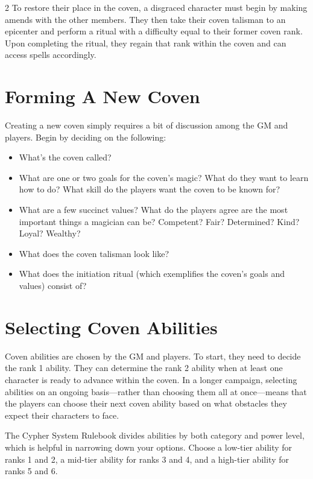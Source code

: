 \begin{multicols}{2}
To restore their place in the coven, a disgraced character must begin by making amends with the other members. They then take their coven talisman to an epicenter and perform a ritual with a difficulty equal to their former coven rank. Upon completing the ritual, they regain that rank within the coven and can access spells accordingly.

\section{Forming A New Coven}

Creating a new coven simply requires a bit of discussion among the GM and players. Begin by deciding on the following: 

\begin{itemize}
\item What’s the coven called? 
\item What are one or two goals for the coven’s magic? What do they want to learn how to do? What skill do the players want the coven to be known for? 
\item What are a few succinct values? What do the players agree are the most important things a magician can be? Competent? Fair? Determined? Kind? Loyal? Wealthy? 
\item What does the coven talisman look like? 
\item What does the initiation ritual (which exemplifies the coven’s goals and values) consist of? 
\end{itemize}

\section{Selecting Coven Abilities}

Coven abilities are chosen by the GM and players. To start, they need to decide the rank 1 ability. They can determine the rank 2 ability when at least one character is ready to advance within the coven. In a longer campaign, selecting abilities on an ongoing basis—rather than choosing them all at once—means that the players can choose their next coven ability based on what obstacles they expect their characters to face. 

The Cypher System Rulebook divides abilities by both category and power level, which is helpful in narrowing down your options. Choose a low-tier ability for ranks 1 and 2, a mid-tier ability for ranks 3 and 4, and a high-tier ability for ranks 5 and 6. 


\end{multicols}
